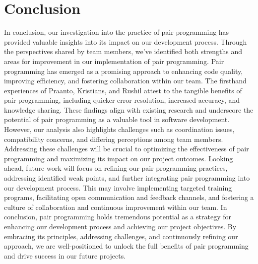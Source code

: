 \section{Conclusion}
In conclusion, our investigation into the practice of pair programming has provided valuable insights into its impact on our development process. Through the perspectives shared by team members, we've identified both strengths and areas for improvement in our implementation of pair programming.
Pair programming has emerged as a promising approach to enhancing code quality, improving efficiency, and fostering collaboration within our team. The firsthand experiences of Praanto, Kristians, and Rushil attest to the tangible benefits of pair programming, including quicker error resolution, increased accuracy, and knowledge sharing. These findings align with existing research and underscore the potential of pair programming as a valuable tool in software development.
However, our analysis also highlights challenges such as coordination issues, compatibility concerns, and differing perceptions among team members. Addressing these challenges will be crucial to optimizing the effectiveness of pair programming and maximizing its impact on our project outcomes.
Looking ahead, future work will focus on refining our pair programming practices, addressing identified weak points, and further integrating pair programming into our development process. This may involve implementing targeted training programs, facilitating open communication and feedback channels, and fostering a culture of collaboration and continuous improvement within our team.
In conclusion, pair programming holds tremendous potential as a strategy for enhancing our development process and achieving our project objectives. By embracing its principles, addressing challenges, and continuously refining our approach, we are well-positioned to unlock the full benefits of pair programming and drive success in our future projects.
